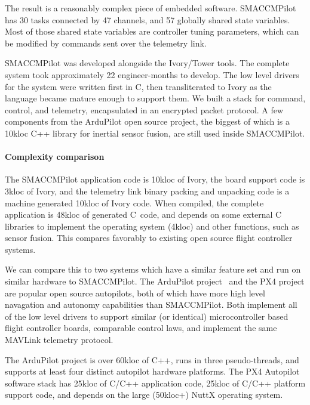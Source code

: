 The result is a reasonably complex piece of embedded software. SMACCMPilot has
30 tasks connected by 47 channels, and 57 globally shared state variables. Most
of those shared state variables are controller tuning parameters, which can be
modified by commands sent over the telemetry link.

SMACCMPilot was developed alongside the Ivory/Tower tools.  The complete system
took approximately 22 engineer-months to develop.  The low level drivers for the
system were written first in C, then transliterated to Ivory as the language
became mature enough to support them. We built a stack for command, control, and
telemetry, encapsulated in an encrypted packet protocol. A few components from
the ArduPilot open source project, the biggest of which is a 10kloc C++ library
for inertial sensor fusion, are still used inside SMACCMPilot.

\paragraph{Complexity comparison}
The SMACCMPilot application code is 10kloc of Ivory, the board support code
is 3kloc of Ivory, and the telemetry link binary packing and unpacking
code is a machine generated 10kloc of Ivory code. When compiled, the complete
application
is 48kloc of generated C~code, and depends on some external C libraries to
implement the operating system (4kloc) and other functions, such as sensor
fusion.  This compares favorably to existing open source flight controller
systems.

We can compare this to two systems which have a similar feature set and run on
similar hardware to SMACCMPilot.  The ArduPilot project~\cite{apm-proj} and the
PX4 project are popular open source autopilots, both of which have more high
level navagation and autonomy capabilities than SMACCMPilot.  Both implement all
of the low level drivers to support similar (or identical) microcontroller based
flight controller boards, comparable control laws, and implement the same
MAVLink telemetry protocol.

The ArduPilot project is over 60kloc of C++, runs in three pseudo-threads, and
supports at least four distinct autopilot hardware platforms. The PX4 Autopilot
software stack has 25kloc of C/C++ application code, 25kloc of C/C++ platform
support code, and depends on the large (50kloc+) NuttX operating system.

